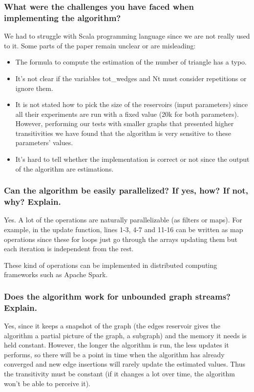 \documentclass[12pt, a4paper]{article}
\begin{document}
\subsubsection*{What were the challenges you have faced when implementing the algorithm?}
We had to struggle with Scala programming language since we are not really used to it.
Some parts of the paper remain unclear or are misleading:
\begin{itemize}
\item The formula to compute the estimation of the number of triangle has a typo.
\item It's not clear if the variables tot\_wedges and Nt must consider repetitions or ignore them.
\item It is not stated how to pick the size of the reservoirs (input parameters) since all their experiments are run with a fixed value (20k for both parameters). However, performing our tests with smaller graphs that presented higher transitivities we have found that the algorithm is very sensitive to these parameters' values.
\item It's hard to tell whether the implementation is correct or not since the output of the algorithm are estimations.
\end{itemize}

\subsubsection*{Can the algorithm be easily parallelized? If yes, how? If not, why? Explain.}
Yes. A lot of the operations are naturally parallelizable (as filters or maps). For example, in the update function, lines 1-3, 4-7 and 11-16 can be written as map operations since these for loops just go through the arrays updating them but each iteration is independent from the rest.

These kind of operations can be implemented in distributed computing frameworks such as Apache Spark.

\subsubsection*{Does the algorithm work for unbounded graph streams? Explain.}
Yes, since it keeps a snapshot of the graph (the edges reservoir gives the algorithm a partial picture of the graph, a subgraph) and the memory it needs is held constant. However, the longer the algorithm is run, the less updates it performs, so there will be a point in time when the algorithm has already converged and new edge insertions will rarely update the estimated values. Thus the transitivity must be constant (if it changes a lot over time, the algorithm won't be able to perceive it).
\end{document}
